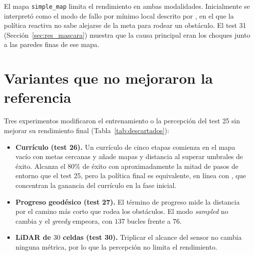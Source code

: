 El mapa \texttt{simple\_map} limita el rendimiento en ambas modalidades.
Inicialmente se interpretó como el modo de fallo por mínimo local
descrito por \citet{gao2025hierarchical}, en el que la política reactiva
no sabe alejarse de la meta para rodear un obstáculo. El test 31
(Sección~\ref{sec:res_mascara}) muestra que la causa principal eran los
choques junto a las paredes finas de ese mapa.

\section{Variantes que no mejoraron la referencia}\label{sec:res_descartados}
Tres experimentos modificaron el entrenamiento o la percepción del test
25 sin mejorar su rendimiento final (Tabla~\ref{tab:descartados}):
\begin{itemize}
    \item \textbf{Currículo (test 26).} Un currículo de cinco etapas
    comienza en el mapa vacío con metas cercanas y añade mapas y distancia
    al superar umbrales de éxito. Alcanza el $80\%$ de éxito con
    aproximadamente la mitad de pasos de entorno que el test 25, pero la
    política final es equivalente, en línea con \citet{xue2022using}, que
    concentran la ganancia del currículo en la fase inicial.
    \item \textbf{Progreso geodésico (test 27).} El término de progreso
    mide la distancia por el camino más corto que rodea los obstáculos. El
    modo \textit{sampled} no cambia y el \textit{greedy} empeora, con
    $137$ bucles frente a $76$.
    \item \textbf{LiDAR de $30$ celdas (test 30).} Triplicar el alcance
    del sensor no cambia ninguna métrica, por lo que la percepción no
    limita el rendimiento.
\end{itemize}

\begin{table}[htbp]
    \centering
    \caption[Variantes que no mejoraron la referencia]{Variantes que no
    mejoraron al test 25. Entre paréntesis, el estadístico $z$ frente al
    test 25; n.s.: no significativo.}
    \label{tab:descartados}
\end{table}

